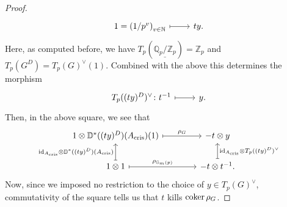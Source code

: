 \begin{proof}
\begin{equation*}
\begin{tikzcd}[row sep = 0ex
		,/tikz/column 1/.append style={anchor=base east}
		,/tikz/column 2/.append style={anchor=base west}]
		1 = \left( 1/p^v \right)_{v \in \mathbb{N}}
		\arrow[r, "", mapsto] &
		ty
	.\end{tikzcd}
	\end{equation*} 
	Here, as computed before, we have $T_p ( \underline{\mathbb{Q}_p/\mathbb{Z}_{p}} ) =
	\mathbb{Z}_{p}$ and $T_p(G^D) = T_p(G)^\vee(1)$.
	Combined with the above this determines the morphism
	\begin{equation*}
	\begin{tikzcd}[row sep = 0ex
		,/tikz/column 1/.append style={anchor=base east}
		,/tikz/column 2/.append style={anchor=base west}]
		T_p((ty)^D)^\vee\colon 
		t^{-1}
		\arrow[r, "", mapsto] &
		y
	.\end{tikzcd}
	\end{equation*}
	Then, in the above square, we see that
	\begin{equation*}
	\begin{tikzcd}[column sep=4em]
		1 \otimes \mathbb{D}^*((ty)^D)(A_{\mathrm{cris}})(1) 
		\arrow[r, "\rho_G", mapsto] &
		-t \otimes y \\
		1 \otimes 1
		\arrow[u, "\mathrm{id}_{ A_{\mathrm{cris}} } \otimes \mathbb{D}^*((ty)^D)(A_{\mathrm{cris}})", mapsto] 
		\arrow[r, "\rho_{\mathbb{G}_m(p)}", mapsto] &
		-t \otimes t^{-1}
		\arrow[u, "\mathrm{id}_{ A_{\mathrm{cris}} } \otimes T_p((ty)^D)^\vee"', mapsto] 
	.\end{tikzcd}
	\end{equation*}
	Now, since we imposed no restriction to the choice of $y \in T_p(G)^\vee$, 
	commutativity of the square tells us that $t$ kills $\operatorname{coker} \rho_G$.


\end{proof}
